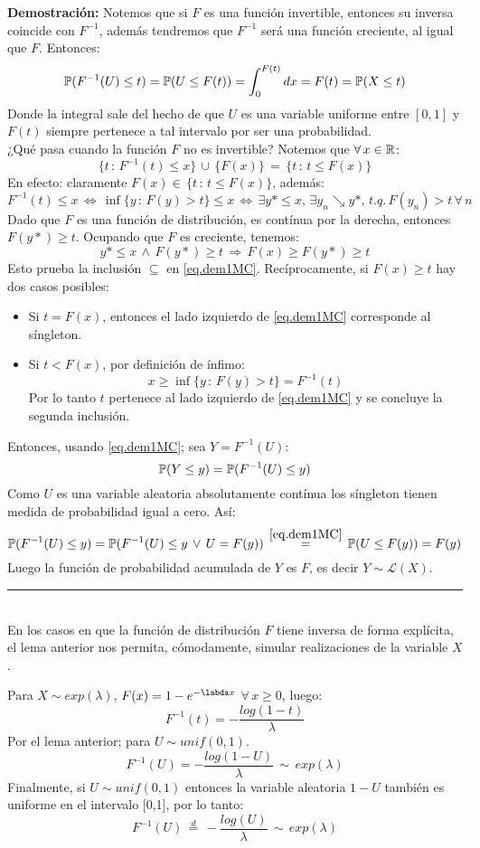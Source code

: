 \textbf{Demostración: }Notemos que si $F$ es una función invertible, entonces su inversa coincide con $F^{-1}$, además tendremos que $F^{-1}$ será una función creciente, al igual que $F$. Entonces:
\[\mathbb{P}(F^{-1}(U)\leq t) = \mathbb{P}(U\leq F(t)) = \int_{0}^{F(t)}dx = F(t) = \mathbb{P}(X\leq t)\]
Donde la integral sale del hecho de que $U$ es una variable uniforme entre $[0,1]$ y $F(t)$ siempre pertenece a tal intervalo por ser una probabilidad.\\ \newline
¿Qué pasa cuando la función $F$ no es invertible? Notemos que $\forall\,x\in\mathbb R$:
\begin{equation}
    \{t\,:\,F^{-1}(t)\leq x\}\,\cup\,\{F(x)\}\,=\,\{t\,:\,t\leq F(x)\}
    \label{eq.dem1MC}
\end{equation}
En efecto: claramente $F(x)\in\,\{t\,:\,t\leq F(x)\}$, además:
\[F^{-1}(t)\leq x\,\Longleftrightarrow\,\inf\{y\,:\,F(y)>t\}\leq x\,\Longleftrightarrow\,\exists y*\leq x,\,\exists y_n\searrow y*,\,t.q.\,F(y_n)>t\,\forall\,n\]
Dado que $F$ es una función de distribución, es contínua por la derecha, entonces $F(y*)\geq t$. Ocupando que $F$ es creciente, tenemos:
\[y*\leq x\,\wedge\,F(y*)\geq t\,\Rightarrow\,F(x)\geq F(y*)\geq t\]
Esto prueba la inclusión $\subseteq$ en \ref{eq.dem1MC}. Recíprocamente, si $F(x)\geq t$ hay dos casos posibles:
\begin{itemize}
    \item Si $t=F(x)$, entonces el lado izquierdo de \ref{eq.dem1MC} corresponde al síngleton.
    \item Si $t<F(x)$, por definición de ínfimo:
    \[x\geq \inf\{y\,:\,F(y)>t\} = F^{-1}(t)\]
    Por lo tanto $t$ pertenece al lado izquierdo de \ref{eq.dem1MC} y se concluye la segunda inclusión.
\end{itemize}
Entonces, usando \ref{eq.dem1MC}; sea $Y=F^{-1}(U)$:
\[\mathbb{P}(Y\leq y) = \mathbb{P}(F^{-1}(U)\leq y)\]
Como $U$ es una variable aleatoria absolutamente contínua los síngleton tienen medida de probabilidad igual a cero. Así:
\[\mathbb{P}(F^{-1}(U)\leq y) = \mathbb{P}(F^{-1}(U)\leq y\,\vee\,U=F(y))\, \overset{\ref{eq.dem1MC}}{=}\,\mathbb{P}(U\leq F(y)) = F(y)\]
Luego la función de probabilidad acumulada de $Y$ es $F$, es decir $Y\sim \mathcal{L}(X)$. \rule{0.7em}{0.7em}\\ \newline
En los casos en que la función de distribución $F$ tiene inversa de forma explícita, el lema anterior nos permita, cómodamente, simular realizaciones de la variable $X$.

\begin{ejemplo} Para $X\sim exp(\lambda)$, $F(x)=1-e^{-\labda x}$ $\forall\,x\geq 0$, luego:
\[F^{-1}(t) = -\frac{log(1-t)}{\lambda}\]
Por el lema anterior; para $U\sim unif(0,1)$.
\[F^{-1}(U) = -\frac{log(1-U)}{\lambda}\,\sim\,exp(\lambda)\]
Finalmente, si $U\sim unif(0,1)$ entonces la variable aleatoria $1-U$ también es uniforme en el intervalo [0,1], por lo tanto:
\[F^{-1}(U)\,\overset{d}{=}\,-\frac{log(U)}{\lambda}\,\sim\,exp(\lambda)\]
\end{ejemplo}

